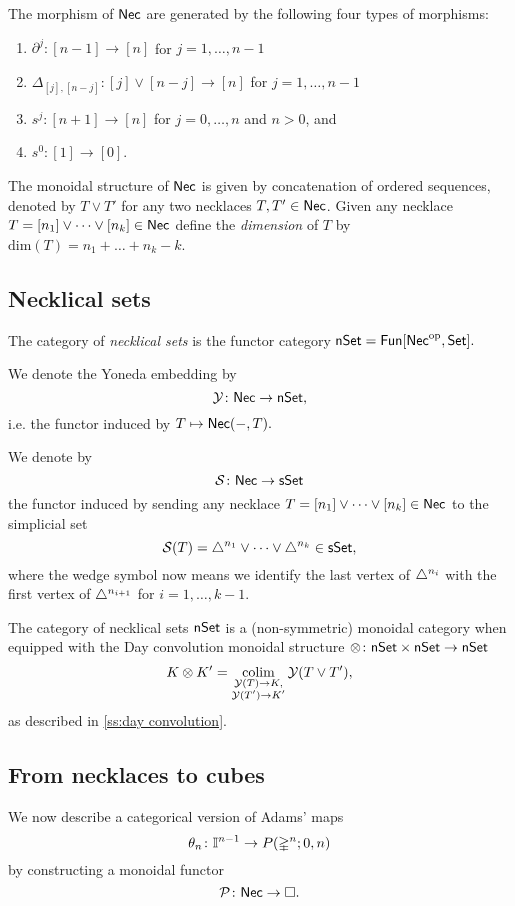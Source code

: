 The morphism of $\mathsf{Nec}$ are generated by the following four types of morphisms:
\begin{enumerate}
	\item $\partial^j \colon [n-1] \to [n]$ for $j = 1, \dots, n-1$
	\item $\Delta_{[j], [n-j]} \colon  [j] \vee [n-j] \to [n]$ for $j = 1, \dots, n-1$
	\item $s^j \colon [n+1] \to [n]$ for $j = 0, \dots, n$ and $n>0$, and 
	\item $s^0 \colon [1] \to [0]$.
\end{enumerate}
The monoidal structure of $\mathsf{Nec}$ is given by concatenation of ordered sequences, denoted by $T \vee T'$ for any two necklaces $T, T' \in \mathsf{Nec}$.
Given any necklace $T = [n_1] \vee \dots \vee[n_k] \in \mathsf{Nec}$ define the \textit{dimension} of $T$ by $\text{dim}(T)=n_1 + \dots + n_k-k$.

\subsection{Necklical sets}

The category of \textit{necklical sets} is the functor category $\mathsf{nSet}=\mathsf{Fun}[\mathsf{Nec}^{\mathrm{op}}, \mathsf{Set}].$

We denote the Yoneda embedding by $$\mathcal{Y} \colon \mathsf{Nec} \to \mathsf{nSet},$$ i.e. the functor induced by $T \mapsto \mathsf{Nec}(-,T).$

We denote by $$\mathcal{S} \colon \mathsf{Nec} \to \mathsf{sSet}$$ the functor induced by sending any necklace $T=[n_1] \vee \dots \vee[n_k] \in \mathsf{Nec}$ to the simplicial set $$\mathcal{S}(T)= \triangle^{n_1} \vee\dots \vee \triangle^{n_k} \in \mathsf{sSet},$$ where the wedge symbol now means we identify the last vertex of $\triangle^{n_i}$ with the first vertex of $\triangle^{n_{i+1}}$ for $i=1,\dots,k-1$.

The category of necklical sets $\mathsf{nSet}$ is a (non-symmetric) monoidal category when equipped with the Day convolution monoidal structure $\otimes\colon \mathsf{nSet} \times \mathsf{nSet} \to \mathsf{nSet}$
$$K \otimes K' = \operatorname*{colim}_{\substack{\mathcal{Y}(T) \to K, \\ \mathcal{Y}(T')\to K'}} \mathcal{Y}(T \vee T'),$$ as described in
 \cref{ss:day convolution}.

\subsection{From necklaces to cubes}

We now describe a categorical version of Adams' maps
\begin{equation*}
\theta_n \colon \mathbb{I}^{n-1} \to P(\mathbb{\Delta}^{n};0,n)
\end{equation*}
by constructing a monoidal functor
\begin{equation*}
\mathcal{P} \colon \mathsf{Nec} \to \square.
\end{equation*}

